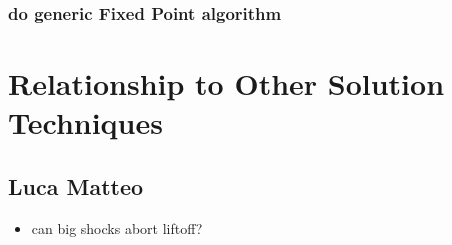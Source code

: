 \documentclass[tikz]{beamer}
\begin{document}
\begin{frame}[fragile]
\frametitle{do generic Fixed Point algorithm}
{\small 


}

\end{frame}



\section{Relationship to Other Solution Techniques}

\cite{holden15:_exist_dsge,guerrieri15:_occbin,benigno09,hintermaier10,brumm10,nakov08,haefke98,nakata12,gordon11,billi11,Hintermaier2010,Guerrieri2015}

\subsection{Luca Matteo}

  \begin{itemize}
\item can big shocks  abort liftoff?
  \end{itemize}
\end{document}
